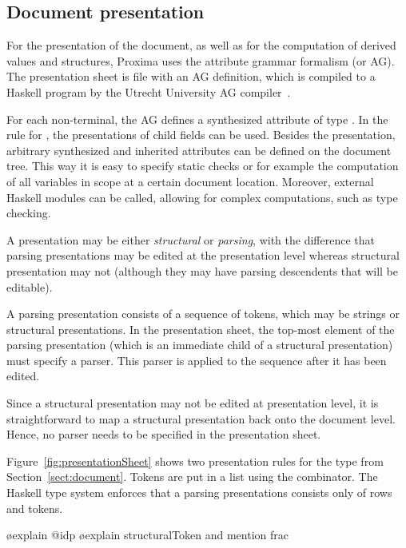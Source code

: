 \documentclass[12pt]{article}
\begin{document}
\subsection{Document presentation}

For the presentation of the document, as well as for the computation of derived values and structures, Proxima uses the attribute grammar formalism (or AG). The presentation sheet is file with an AG definition, which is compiled to a Haskell program by the Utrecht University AG compiler~\cite{swierstra08ag}.

For each non-terminal, the AG defines a synthesized attribute  of type . In the rule for , the presentations of child fields can be used. Besides the presentation, arbitrary synthesized and inherited attributes can be defined on the document tree. This way it is easy to specify static checks or for example the computation of all variables in scope at a certain document location. Moreover, external Haskell modules can be called, allowing for complex computations, such as type checking.


A presentation may be either {\em structural} or {\em parsing}, with the difference that parsing presentations may be edited at the presentation level whereas structural presentation may not (although they may have parsing descendents that will be editable). 

A parsing presentation consists of a sequence of tokens, which may be strings or structural presentations. In the presentation sheet, the top-most element of the parsing presentation (which is an immediate child of a structural presentation) must specify a parser. This parser is applied to the sequence after it has been edited.

Since a structural presentation may not be edited at presentation level, it is straightforward to map a structural presentation back onto the document level. Hence, no parser needs to be specified in the presentation sheet.

Figure~\ref{fig:presentationSheet} shows two presentation rules for the type  from Section~\ref{sect:document}. Tokens are put in a list using the  combinator. The Haskell type system enforces that a parsing presentations consists only of rows and tokens. 

\bl
\o explain @idp
\o explain structuralToken and mention frac
\el
\end{document}
